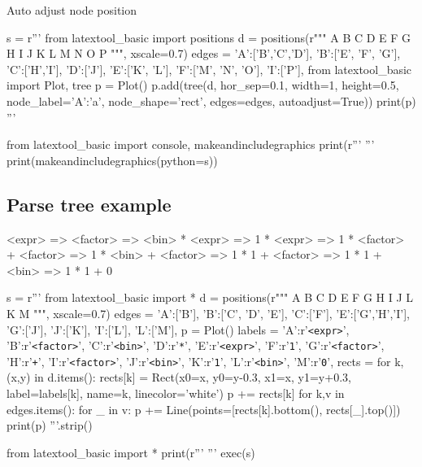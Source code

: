 \newpage
Auto adjust node position
\begin{python}
s = r'''
from latextool_basic import positions
d = positions(r"""
      A   
  B   C   D
E F G H   I J  
K L M N O P
""", xscale=0.7)
edges = {'A':['B','C','D'], 'B':['E', 'F', 'G'],
         'C':['H','I'],     'D':['J'],
         'E':['K', 'L'],    'F':['M', 'N', 'O'],
         'I':['P'],
}
from latextool_basic import Plot, tree
p = Plot()
p.add(tree(d, hor_sep=0.1,
           width=1, height=0.5, 
           node_label={'A':'a'}, node_shape='rect',
           edges=edges,
           autoadjust=True))
print(p)
'''

from latextool_basic import console, makeandincludegraphics
print(r'''{\small
}''' %
print(makeandincludegraphics(python=s))
\end{python}


\newpage
\subsection{Parse tree example}

\begin{console}
<expr> => <factor>
       => <bin> * <expr>
       => 1 * <expr>
       => 1 * <factor> + <factor>
       => 1 * <bin> + <factor>
       => 1 * 1 + <factor>
       => 1 * 1 + <bin>
       => 1 * 1 + 0
\end{console}

\begin{python}
s = r'''
from latextool_basic import *
d = positions(r"""
   A
   B
C  D  E
F   G H I
    J   L
    K   M
""", xscale=0.7)
edges = {'A':['B'],          'B':['C', 'D', 'E'], 'C':['F'],
         'E':['G','H','I'],  'G':['J'],           'J':['K'],
         'I':['L'],          'L':['M'],
        }
p = Plot()
labels = {'A':r'\texttt{<expr>}',   'B':r'\texttt{<factor>}',
          'C':r'\texttt{<bin>}',    'D':r'\texttt{*}',
          'E':r'\texttt{<expr>}',   'F':r'\texttt{1}',
          'G':r'\texttt{<factor>}', 'H':r'\texttt{+}',
          'I':r'\texttt{<factor>}', 'J':r'\texttt{<bin>}',
          'K':r'\texttt{1}',        'L':r'\texttt{<bin>}',
          'M':r'\texttt{0}',
        }
rects = {}
for k,(x,y) in d.items():
    rects[k] = Rect(x0=x, y0=y-0.3, x1=x, y1=y+0.3, label=labels[k],
                    name=k, linecolor='white')
    p += rects[k]
for k,v in edges.items():
    for _ in v:
        p += Line(points=[rects[k].bottom(), rects[_].top()])
print(p)
'''.strip()

from latextool_basic import *
print(r'''{\small
}''' %
exec(s)
\end{python}






